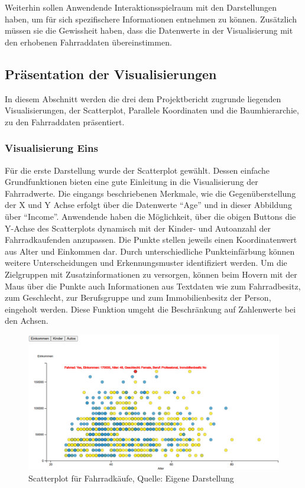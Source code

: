 \documentclass[usegeometry=true]{scrartcl}
\begin{document}
Weiterhin sollen Anwendende Interaktionsspielraum mit den Darstellungen haben, um für sich spezifischere Informationen entnehmen zu können. Zusätzlich müssen sie die Gewissheit haben, dass die Datenwerte in der Visualisierung mit den erhobenen Fahrraddaten übereinstimmen. 
\subsection{Präsentation der Visualisierungen}
In diesem Abschnitt werden die drei dem Projektbericht zugrunde liegenden Visualisierungen, der Scatterplot, Parallele Koordinaten und die Baumhierarchie, zu den Fahrraddaten präsentiert. 
\subsubsection{Visualisierung Eins}
Für die erste Darstellung wurde der Scatterplot gewählt. Dessen einfache Grundfunktionen bieten eine gute Einleitung in die Visualisierung der Fahrradwerte. Die eingangs beschriebenen Merkmale, wie die Gegenüberstellung der X und Y Achse erfolgt über die Datenwerte "`Age"' und in dieser Abbildung über "`Income"'. Anwendende haben die Möglichkeit, über die obigen Buttons die Y-Achse des Scatterplots dynamisch mit der Kinder- und Autoanzahl der Fahrradkaufenden anzupassen. 
Die Punkte stellen jeweils einen Koordinatenwert aus Alter und Einkommen dar. Durch unterschiedliche Punkteinfärbung können weitere Unterscheidungen und Erkennungsmuster identifiziert werden. 
Um die Zielgruppen mit Zusatzinformationen zu versorgen, können beim Hovern mit der Maus über die Punkte auch Informationen aus Textdaten wie zum Fahrradbesitz, zum Geschlecht, zur Berufsgruppe und zum Immobilienbesitz der Person, eingeholt werden. Diese Funktion umgeht die Beschränkung auf Zahlenwerte bei den Achsen.
\begin{figure}[h]
\begin{center}
\includegraphics[width=16cm]{Bilder/V1Scatterplot.png}
\caption{Scatterplot für Fahrradkäufe, Quelle: Eigene Darstellung}
\end{center}
\end{figure}
\end{document}
